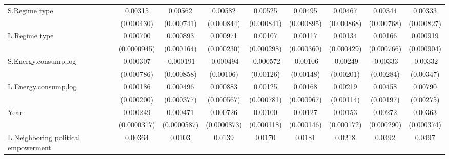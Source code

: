 \begin{table}[htbp]
\begin{tabular}{l*{8}{c}}
S.Regime type       &     0.00315\sym{***}&     0.00562\sym{***}&     0.00582\sym{***}&     0.00525\sym{***}&     0.00495\sym{***}&     0.00467\sym{***}&     0.00344\sym{***}&     0.00333\sym{***}\\
                    &  (0.000430)         &  (0.000741)         &  (0.000844)         &  (0.000841)         &  (0.000895)         &  (0.000868)         &  (0.000768)         &  (0.000827)         \\
[1em]
L.Regime type       &    0.000700\sym{***}&    0.000893\sym{***}&    0.000971\sym{***}&     0.00107\sym{***}&     0.00117\sym{***}&     0.00134\sym{***}&     0.00166\sym{**} &    0.000919         \\
                    & (0.0000945)         &  (0.000164)         &  (0.000230)         &  (0.000298)         &  (0.000360)         &  (0.000429)         &  (0.000766)         &  (0.000904)         \\
[1em]
S.Energy.consump,log&    0.000307         &   -0.000191         &   -0.000494         &   -0.000572         &    -0.00106         &    -0.00249         &    -0.00333         &    -0.00332         \\
                    &  (0.000786)         &  (0.000858)         &   (0.00106)         &   (0.00126)         &   (0.00148)         &   (0.00201)         &   (0.00284)         &   (0.00347)         \\
[1em]
L.Energy.consump,log&    0.000186         &    0.000496         &    0.000883         &     0.00125         &     0.00168\sym{*}  &     0.00219\sym{*}  &     0.00458\sym{**} &     0.00790\sym{***}\\
                    &  (0.000200)         &  (0.000377)         &  (0.000567)         &  (0.000781)         &  (0.000967)         &   (0.00114)         &   (0.00197)         &   (0.00275)         \\
[1em]
Year                &    0.000249\sym{***}&    0.000471\sym{***}&    0.000726\sym{***}&     0.00100\sym{***}&     0.00127\sym{***}&     0.00153\sym{***}&     0.00272\sym{***}&     0.00363\sym{***}\\
                    & (0.0000317)         & (0.0000587)         & (0.0000873)         &  (0.000118)         &  (0.000146)         &  (0.000172)         &  (0.000290)         &  (0.000374)         \\
[1em]
L.Neighboring political empowerment&     0.00364         &      0.0103\sym{*}  &      0.0139         &      0.0170         &      0.0181         &      0.0218         &      0.0392         &      0.0497         \\

\end{tabular}
\end{table}
